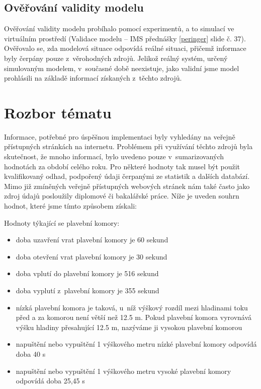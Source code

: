 \documentclass[11pt,a4paper]{article}
\begin{document}
    \subsection{Ověřování validity modelu}

      Ověřování validity modelu probíhalo pomocí experimentů, a to simulací ve
      virtuálním prostředí (Validace modelu -- IMS přednášky \ref{peringer}
      slide č. 37). Ověřovalo se, zda modelová situace odpovídá reálné situaci,
      přičemž informace byly čerpány pouze z~věrohodných zdrojů.
      Jelikož reálný systém, určený simulovaným modelem, v~současné době
      neexistuje, jako validní jsme model prohlásili na základě
      informací získaných z~těchto zdrojů.

  \section{Rozbor tématu}

    Informace, potřebné pro úspěšnou implementaci byly vyhledány na veřejně
    přístupných stránkách na internetu. Problémem při využívání těchto zdrojů
    byla skutečnost, že mnoho informací, bylo uvedeno pouze v~sumarizovaných
    hodnotách za období celého roku.  Pro některé hodnoty tak musel být použit
    kvalifikovaný odhad, podpořený údaji čerpanými ze statistik a dalších
    databází. Mimo již zmíněných veřejně přístupných webových stránek nám také
    často jako zdroj údajů posloužily diplomové či bakalářské práce. Níže je
    uveden souhrn hodnot, které jsme tímto způsobem získali:

    \noindent
    Hodnoty týkající se plavební komory:

    \begin{itemize}
      \item doba uzavření vrat plavební komory je 60 sekund
      \item doba otevření vrat plavební komory je 30 sekund
      \item doba vplutí do plavební komory je 516 sekund
      \item doba vyplutí z~plavební komory je 355 sekund
      \item nízká plavební komora je taková, u~níž výškový rozdíl mezi
            hladinami toku před a za komorou není větší než 12.5 m.
            Pokud plavební komora vyrovnává výšku hladiny přesahující 12.5 m,
            nazýváme ji vysokou plavební komorou
      \item napuštění nebo vypuštění 1 výškového metru nízké plavební komory
            odpovídá doba 40
s~\item napuštění nebo vypuštění 1 výškového metru  vysoké plavební komory
            odpovídá doba 25,45
s~\end{itemize}
\end{document}
